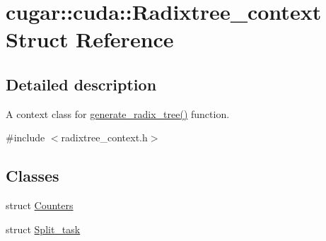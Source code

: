 \hypertarget{structcugar_1_1cuda_1_1_radixtree__context}{}\section{cugar\+:\+:cuda\+:\+:Radixtree\+\_\+context Struct Reference}
\label{structcugar_1_1cuda_1_1_radixtree__context}


\subsection{Detailed description}
A context class for \hyperlink{group__radixtree_gafa925282e2b6e8bd87c1a00c1f1e6807}{generate\+\_\+radix\+\_\+tree()} function. 

{\ttfamily \#include $<$radixtree\+\_\+context.\+h$>$}

\subsection*{Classes}
\begin{DoxyCompactItemize}
\item 
struct \hyperlink{structcugar_1_1cuda_1_1_radixtree__context_1_1_counters}{Counters}
\item 
struct \hyperlink{structcugar_1_1cuda_1_1_radixtree__context_1_1_split__task}{Split\+\_\+task}
\end{DoxyCompactItemize}
